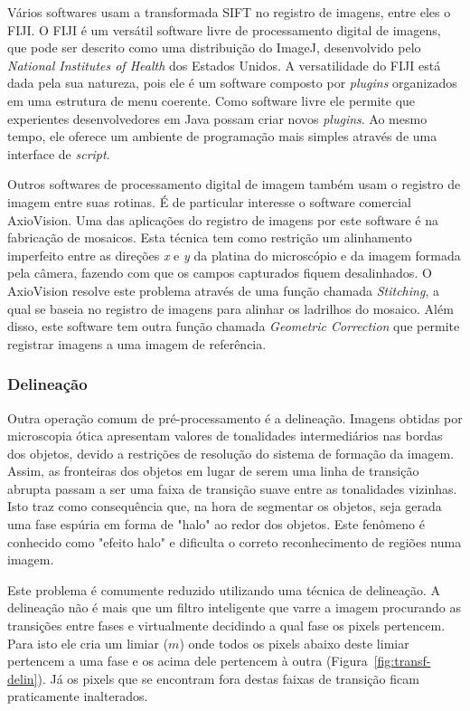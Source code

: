 Vários softwares usam a transformada SIFT no registro de imagens,
entre eles o FIJI. O FIJI é um versátil software livre de
processamento digital de imagens, que pode ser descrito como uma
distribuição do ImageJ, desenvolvido pelo \textit{National Institutes
  of Health} dos Estados Unidos. A versatilidade do FIJI está dada
pela sua natureza, pois ele é um software composto por
\textit{plugins} organizados em uma estrutura de menu coerente. Como
software livre ele permite que experientes desenvolvedores em Java
possam criar novos \textit{plugins}. Ao mesmo tempo, ele oferece um
ambiente de programação mais simples através de uma interface de
\textit{script}.\cite{86}

Outros softwares de processamento digital de imagem também usam o
registro de imagem entre suas rotinas. É de particular interesse o
software comercial AxioVision. Uma das aplicações do registro de
imagens por este software é na fabricação de mosaicos. Esta técnica
tem como restrição um alinhamento imperfeito entre as direções
\textit{x} e \textit{y} da platina do microscópio e da imagem formada
pela câmera, fazendo com que os campos capturados fiquem
desalinhados.\cite{74} O AxioVision resolve este problema através de
uma função chamada \textit{Stitching}, a qual se baseia no registro de
imagens para alinhar os ladrilhos do mosaico. Além disso, este
software tem outra função chamada \textit{Geometric Correction} que
permite registrar imagens a uma imagem de referência.\cite{48}

\subsubsection{Delineação}

Outra operação comum de pré-processamento é a delineação. Imagens
obtidas por microscopia ótica apresentam valores de tonalidades
intermediários nas bordas dos objetos, devido a restrições de
resolução do sistema de formação da imagem. Assim, as fronteiras dos
objetos em lugar de serem uma linha de transição abrupta passam a ser
uma faixa de transição suave entre as tonalidades vizinhas.\cite{87}
Isto traz como consequência que, na hora de segmentar os objetos, seja
gerada uma fase espúria em forma de "halo" ao redor dos objetos. Este
fenômeno é conhecido como "efeito halo" e dificulta o correto
reconhecimento de regiões numa imagem.\cite{52}

Este problema é comumente reduzido utilizando uma técnica de
delineação. A delineação não é mais que um filtro inteligente que
varre a imagem procurando as transições entre fases e virtualmente
decidindo a qual fase os pixels pertencem. Para isto ele cria um
limiar ($m$) onde todos os pixels abaixo deste limiar pertencem a uma
fase e os acima dele pertencem à outra
(Figura~\ref{fig:transf-delin}). Já os pixels que se encontram fora
destas faixas de transição ficam praticamente inalterados.

